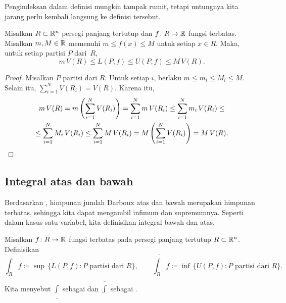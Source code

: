 Pengindeksan dalam definisi mungkin tampak rumit, tetapi untungnya kita jarang
perlu kembali langsung ke definisi tersebut.

\begin{prop} \label{mv:sumulbound:prop}
Misalkan $R \subset {\mathbb{R}}^n$ persegi panjang tertutup dan
$f \colon R \to {\mathbb{R}}$ fungsi terbatas. Misalkan $m, M \in {\mathbb{R}}$ memenuhi
$m \leq f(x) \leq M$ untuk setiap $x \in R$. Maka, untuk setiap partisi
$P$ dari~$R$,
\begin{equation*}
m \, V(R) \leq
L(P,f) \leq U(P,f)
\leq M\, V(R) .
\end{equation*}
\end{prop}

\begin{proof}
Misalkan $P$ partisi dari $R$. Untuk setiap $i$, berlaku
$m \leq m_i \leq M_i \leq M$. Selain itu,
$\sum_{i=1}^N V(R_i) = V(R)$. Karena itu,
\begin{multline*}
m \, V(R) =
m \left( \sum_{i=1}^N V(R_i) \right)
=
\sum_{i=1}^N m \, V(R_i)
\leq
\sum_{i=1}^N m_i \, V(R_i)
\leq
\\
\leq
\sum_{i=1}^N M_i \, V(R_i)
\leq
\sum_{i=1}^N M \,V(R_i)
=
M \left( \sum_{i=1}^N V(R_i) \right)
=
M \,V(R) .  \qedhere
\end{multline*}
\end{proof}

\subsection{Integral atas dan bawah}

Berdasarkan , himpunan jumlah Darboux atas dan bawah
merupakan himpunan terbatas, sehingga kita dapat mengambil infimum dan
supremumnya. Seperti dalam kasus satu variabel, kita definisikan integral bawah
dan atas.

\begin{defn}
Misalkan $f \colon R \to {\mathbb{R}}$ fungsi terbatas pada persegi panjang tertutup
$R \subset {\mathbb{R}}^n$.
Definisikan
\begin{equation*}
\underline{\int_R} f
\coloneqq \sup \, \bigl\{ L(P,f) : P \text{ partisi dari } R \bigr\} , 
\qquad
\overline{\int_R} f
\coloneqq \inf \, \bigl\{ U(P,f) : P \text{ partisi dari } R \bigr\} .
\end{equation*}
Kita menyebut $\underline{\int}$ sebagai
\emph{} dan
$\overline{\int}$ sebagai \emph{}.
\end{defn}

